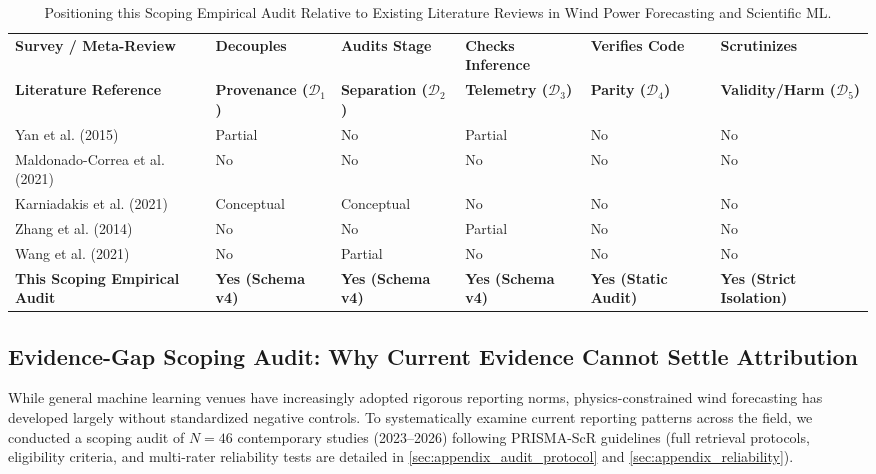 \begin{table}[!t]
\centering
\small
\caption{Positioning this Scoping Empirical Audit Relative to Existing Literature Reviews in Wind Power Forecasting and Scientific ML.}
\label{tab:lit_comparison}
\begin{tabularx}{\textwidth}{p{4.2cm}>{\centering\arraybackslash}X>{\centering\arraybackslash}X>{\centering\arraybackslash}X>{\centering\arraybackslash}X>{\centering\arraybackslash}X}
\toprule
\textbf{Survey / Meta-Review} & \textbf{Decouples} & \textbf{Audits Stage} & \textbf{Checks Inference} & \textbf{Verifies Code} & \textbf{Scrutinizes} \\
\textbf{Literature Reference} & \textbf{Provenance ($\mathcal{D}_1$)} & \textbf{Separation ($\mathcal{D}_2$)} & \textbf{Telemetry ($\mathcal{D}_3$)} & \textbf{Parity ($\mathcal{D}_4$)} & \textbf{Validity/Harm ($\mathcal{D}_5$)} \\
\midrule
Yan et al. (2015) \cite{yan2016review} & Partial & No & Partial & No & No \\
Maldonado-Correa et al. (2021) \cite{maldonadocorrea2020slr} & No & No & No & No & No \\
Karniadakis et al. (2021) \cite{karniadakis2021physics} & Conceptual & Conceptual & No & No & No \\
Zhang et al. (2014) \cite{zhang2014wind} & No & No & Partial & No & No \\
Wang et al. (2021) \cite{wang2021review} & No & Partial & No & No & No \\
\midrule
\textbf{This Scoping Empirical Audit} & \textbf{Yes (Schema v4)} & \textbf{Yes (Schema v4)} & \textbf{Yes (Schema v4)} & \textbf{Yes (Static Audit)} & \textbf{Yes (Strict Isolation)} \\
\bottomrule
\end{tabularx}
\end{table}

\subsection{Evidence-Gap Scoping Audit: Why Current Evidence Cannot Settle Attribution}
\label{subsec:evidence_gap_audit}
While general machine learning venues have increasingly adopted rigorous reporting norms, physics-constrained wind forecasting has developed largely without standardized negative controls. To systematically examine current reporting patterns across the field, we conducted a scoping audit of $N=46$ contemporary studies (2023--2026) following PRISMA-ScR guidelines (full retrieval protocols, eligibility criteria, and multi-rater reliability tests are detailed in \ref{sec:appendix_audit_protocol} and \ref{sec:appendix_reliability}).

